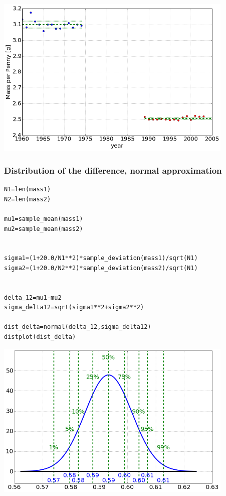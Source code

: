 \begin{center}\includegraphics[width=4.5in]{Applications_of_Parameter_Estimation/Applications_of_Parameter_Estimation_fig8.png}\end{center}

\subsubsection{Distribution of the difference, normal approximation}


\begin{lstlisting}
N1=len(mass1)
N2=len(mass2)

mu1=sample_mean(mass1)
mu2=sample_mean(mass2)


sigma1=(1+20.0/N1**2)*sample_deviation(mass1)/sqrt(N1)
sigma2=(1+20.0/N2**2)*sample_deviation(mass2)/sqrt(N1)


delta_12=mu1-mu2
sigma_delta12=sqrt(sigma1**2+sigma2**2)

dist_delta=normal(delta_12,sigma_delta12)
distplot(dist_delta)
\end{lstlisting}

\begin{center}\includegraphics[width=4.5in]{Applications_of_Parameter_Estimation/Applications_of_Parameter_Estimation_fig9.png}\end{center}

